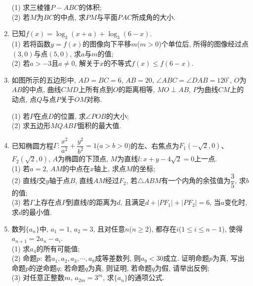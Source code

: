 \documentclass[10pt,a4paper]{article}
\begin{document}
\begin{enumerate}[1.]
\begin{center}
\end{center}
(1) 求三棱锥$P-ABC$的体积;\\
(2) 若$M$为$BC$的中点, 求$PM$与平面$PAC$所成角的大小.
\item 已知$f(x)=\log_3(x+a)+\log_3(6-x)$.\\
(1) 若将函数$y=f(x)$的图像向下平移$m$($m>0$)个单位后, 所得的图像经过点$(3,0)$与点$(5,0)$, 求$a$与$m$的值;\\
(2) 若$a>-3$且$a\ne 0$, 解关于$x$的不等式$f(x)\le f(6-x)$.
\item 如图所示的五边形中, $AD=BC=6$, $AB=20$, $\angle ABC=\angle DAB=120^\circ$, $O$为$AB$的中点, 曲线$CMD$上所有点到$O$的距离相等, $MO\perp AB$, $P$为曲线$CM$上的动点, 点$Q$与点$P$关于$OM$对称.
\begin{center}
\end{center}
(1) 若$P$在点$D$的位置, 求$\angle POB$的大小;\\
(2) 求五边形$MQABP$面积的最大值.
\item 已知椭圆方程$\Gamma: \dfrac{x^2}{a^2}+\dfrac{y^2}{b^2}=1$($a>b>0$)的左、右焦点为$F_1(-\sqrt{2},0)$、$F_2(\sqrt{2},0)$, $A$为椭圆的下顶点, $M$为直线$l:x+y-4\sqrt{2}=0$上一点.\\
(1) 若$a=2$, $AM$的中点在$x$轴上, 求点$M$的坐标;\\
(2) 直线$l$交$y$轴于点$B$, 直线$AM$经过$F_2$, 若$\triangle ABM$有一个内角的余弦值为$\dfrac 35$, 求$b$的值;\\
(3) 若$\Gamma$上存在点$P$到直线$l$的距离为$d$, 且满足$d+|PF_1|+|PF_2|=6$, 当$a$变化时, 求$d$的最小值.
\item 数列$\{a_n\}$中, $a_1=1$, $a_2=3$, 且对任意$n$($n\ge 2$), 都存在$i$($1\le i\le n-1$), 使得$a_{n+1}=2a_n-a_i$.\\
(1) 求$a_4$的所有可能值;\\
(2) 命题$p$: 若$a_1,a_2,a_3,\cdots,a_8$成等差数列, 则$a_9<30$成立. 证明命题$p$为真, 写出命题$p$的逆命题$q$; 若命题$q$为真, 则证明, 若命题$q$为假, 请举出反例;\\
(3) 对任意正整数$m$, $a_{2m}=3^m$, 求$\{a_n\}$的通项公式.
\end{enumerate}
\end{document}
